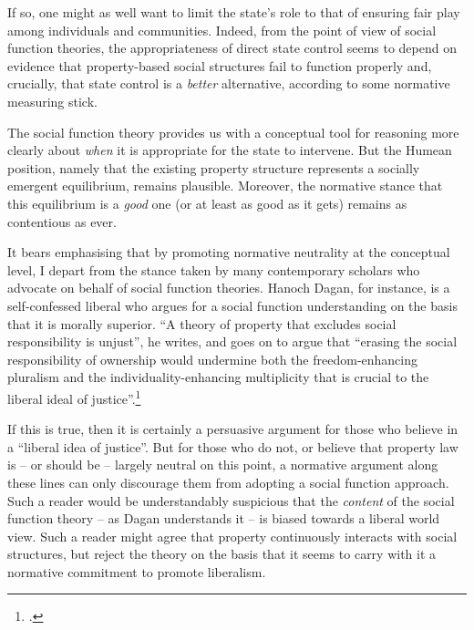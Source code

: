 If so, one might as well want to limit the state's role to that of ensuring fair play among individuals and communities. Indeed, from the point of view of social function theories, the appropriateness of direct state control seems to depend on evidence that property-based social structures fail to function properly and, crucially, that state control is a {\it better} alternative, according to some normative measuring stick.



The social function theory provides us with a conceptual tool for reasoning more clearly about {\it when} it is appropriate for the state to intervene. But the Humean position, namely that the existing property structure represents a socially emergent equilibrium, remains plausible. Moreover, the normative stance that this equilibrium is a {\it good} one (or at least as good as it gets) remains as contentious as ever.

It bears emphasising that by promoting normative neutrality at the conceptual level, I depart from the stance taken by many contemporary scholars who advocate on behalf of social function theories. Hanoch Dagan, for instance, is a self-confessed liberal who argues for a social function understanding on the basis that it is morally superior. ``A theory of property that excludes social responsibility is unjust'', he writes, and goes on to argue that ``erasing the social responsibility of ownership would undermine both the freedom-enhancing pluralism and the individuality-enhancing multiplicity that is crucial to the liberal ideal of justice''.\footcite[1259]{dagan07}

If this is true, then it is certainly a persuasive argument for those who believe in a ``liberal idea of justice''. But for those who do not, or believe that property law is -- or should be -- largely neutral on this point, a normative argument along these lines can only discourage them from adopting a social function approach. Such a reader would be understandably suspicious that the {\it content} of the social function theory -- as Dagan understands it -- is biased towards a liberal world view. Such a reader might agree that property continuously interacts with social structures, but reject the theory on the basis that it seems to carry with it a normative commitment to promote liberalism.

